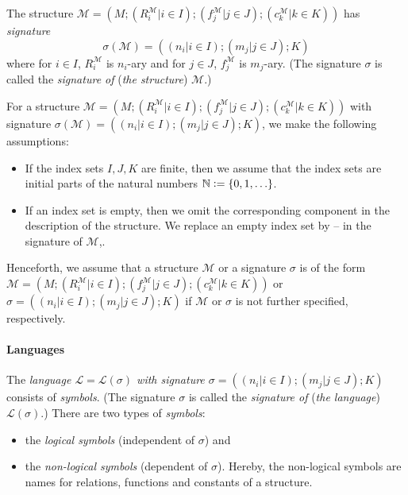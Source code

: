 The structure $\mathcal{M} = (M; (R_i^\mathcal{M} | i \in I); (f_j^\mathcal{M}| j \in J); (c_k^\mathcal{M} | k \in K))$ has \textit{signature} \[ \sigma(\mathcal{M}) = ((n_i | i \in I); (m_j|j\in J); K) \]
where for $i \in I$, $R_i^\mathcal{M}$ is $n_i$-ary and for $j \in J$, $f_j^\mathcal{M}$ is $m_j$-ary. (The signature $\mathcal{\sigma}$ is called the \textit{signature of }(\textit{the structure}) $\mathcal{M}$.) 

For a structure $\mathcal{M} = (M; (R_i^\mathcal{M} | i \in I); (f_j^\mathcal{M}| j \in J); (c_k^\mathcal{M} | k \in K))$ with signature $\sigma(\mathcal{M}) = ((n_i | i \in I); (m_j|j\in J); K)$, we make the following assumptions:
\begin{itemize}
\item If the index sets $I, J, K$ are finite, then we assume that the index sets are initial parts of the natural numbers $\mathbb{N} \vcentcolon=\lbrace 0,1, \ldots \rbrace$. 
\item If an index set is empty, then we omit the corresponding component in the description of the structure. We replace an empty index set by -- in the signature of $\mathcal{M}$,.
\end{itemize}

Henceforth, we assume that a structure $\mathcal{M}$ or a signature $\sigma$ is of the form $\mathcal{M} = (M; (R_i^\mathcal{M} | i \in I); (f_j^\mathcal{M}| j \in J); (c_k^\mathcal{M} | k \in K))$ or $\sigma = ((n_i | i \in I); (m_j|j\in J); K)$ if $\mathcal{M}$ or $\sigma$ is not further specified, respectively. 

\paragraph{Languages}
The \textit{language $\mathcal{L} = \mathcal{L}(\sigma)$ with signature $\sigma = ((n_i | i \in I); (m_j|j\in J); K)$} consists of \textit{symbols}. (The signature $\mathcal{\sigma}$ is called the \textit{signature of }(\textit{the language}) $\mathcal{L}(\sigma)$.) 
 There are two types of \textit{symbols}:
\begin{itemize}
\item the \textit{logical symbols} (independent of $\sigma$) and
\item the \textit{non-logical symbols} (dependent of $\sigma$). Hereby, the non-logical symbols are names for relations, functions and constants of a structure.
\end{itemize}

